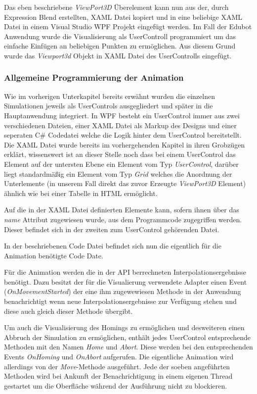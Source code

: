 Das eben beschriebene \textit{ViewPort3D} Überelement kann nun aus der, durch Expression Blend erstellten, XAML Datei kopiert und in eine beliebige XAML Datei in einem Visual Studio WPF Projekt eingefügt werden. Im Fall der Edubot Anwendung wurde die Visualisierung als UserControll programmiert um das einfache Einfügen an beliebigen Punkten zu ermöglichen. Aus diesem Grund wurde das \textit{Viewport3d} Objekt in XAML Datei des UserControlls eingefügt.

\subsubsection{Allgemeine Programmierung der Animation}
Wie im vorherigen Unterkapitel bereits erwähnt wurden die einzelnen Simulationen jeweils als UserControls ausgegliedert und später in die Hauptanwendung integriert. 
In WPF besteht ein UserControl immer aus zwei verschiedenen Dateien, einer XAML Datei als Markup des Designs und einer seperaten C\# Codedatei welche die Logik hinter dem UserControl bereitstellt. Die XAML Datei wurde bereits im vorhergehenden Kapitel in ihren Grobzügen erklärt, wissenswert ist an dieser Stelle noch dass bei einem UserControl das Element auf der untersten Ebene ein Element vom Typ \textit{UserControl}, darüber liegt standardmäßig ein Element vom Typ \textit{Grid} welches die Anordnung der Unterlemente (in unserem Fall direkt das zuvor Erzeugte \textit{ViewPort3D} Element) ähnlich wie bei einer Tabelle in HTML ermöglicht.

Auf die in der XAML Datei definierten Elemente kann, sofern ihnen über das \textit{name} Attribut zugewiesen wurde, aus dem Programmcode zugegriffen werden. Dieser befindet sich in der zweiten zum UserControl gehörenden Datei.

In der beschriebenen Code Datei befindet sich nun die eigentlich für die Animation benötigte Code Date. 

Für die Animation werden die in der API berrechneten Interpolationsergebnisse benötigt. Dazu besitzt der für die Visualierung verwendete Adapter einen Event (\textit{OnMovementStarted}) der eine ihm zugewewiesen Methode in der Anwendung benachrichtigt wenn neue Interpolationsergebnisse zur Verfügung stehen und diese auch gleich dieser Methode übergibt. 

Um auch die Visualisierung des Homings zu ermöglichen und desweiteren einen Abbruch der Simulation zu ermöglichen, enthält jedes UserControl entsprechende Methoden mit den Namen \textit{Home} und \textit{Abort}. Diese werden bei den entsprechenden Events \textit{OnHoming} und \textit{OnAbort} aufgerufen. Die eigentliche Animation wird allerdings von der \textit{Move}-Methode ausgeführt. Jede der soeben angeführten Methoden wird bei Ankunft der Benachrichtigung in einem eigenen Thread gestartet um die Oberfläche während der Ausführung nicht zu blockieren.

